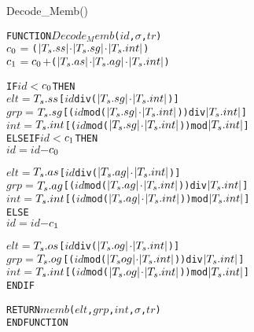 \documentclass[11pt]{report}
\newenvironment{vverbatim}
{
  \begin{alltt}
}
{
    \vspace{-\baselineskip}
  \end{alltt}
}
\newlength{\valgorithmboxwidth}
\newenvironment{valgorithm}[3][tbhp]
{
  \setlength{\valgorithmboxwidth}{\linewidth-2em}

  \begin{valgorithmfloat}[#1]
    \caption{#2}
    \label{#3}
    \hspace{1em}
    \begin{lrbox}{\valgorithmbox}
      \begin{minipage}[l]{\valgorithmboxwidth}
        \small
        \begin{vverbatim}
}
{
        \end{vverbatim}
      \end{minipage}
    \end{lrbox}
    \framebox[\valgorithmboxwidth][l]{\usebox{\valgorithmbox}}
  \end{valgorithmfloat}
}
\begin{document}
        \begin{valgorithm}[tbhp]{Decode\_Memb()}{algo-decode-memb}
FUNCTION \(Decode_Memb\)(\(id\), \(\sigma\), \(tr\))
  \(c\sb{0}\) \(=\) (\(|T\sb{s}.ss|\) \(\cdot\) \(|T\sb{s}.sg|\) \(\cdot\) \(|T\sb{s}.int|\)) 
  \(c\sb{1}\) \(=\) \(c\sb{0}\) \(+\) (\(|T\sb{s}.as|\) \(\cdot\) \(|T\sb{s}.ag|\) \(\cdot\) \(|T\sb{s}.int|\)) 

  IF \(id\) \(<\) \(c\sb{0}\) THEN
    \(elt\) \(=\) \(T\sb{s}.ss\)[\(id\) div (\(|T\sb{s}.sg|\) \(\cdot\) \(|T\sb{s}.int|\))]
    \(grp\) \(=\) \(T\sb{s}.sg\)[(\(id\) mod (\(|T\sb{s}.sg|\) \(\cdot\) \(|T\sb{s}.int|\))) div \(|T\sb{s}.int|\)]
    \(int\) \(=\) \(T\sb{s}.int\)[(\(id\) mod (\(|T\sb{s}.sg|\) \(\cdot\) \(|T\sb{s}.int|\))) mod \(|T\sb{s}.int|\)]
  ELSE IF \(id\) \(<\) \(c\sb{1}\) THEN
    \(id\) \(=\) \(id\) \(-\) \(c\sb{0}\)

    \(elt\) \(=\) \(T\sb{s}.as\)[\(id\) div (\(|T\sb{s}.ag|\) \(\cdot\) \(|T\sb{s}.int|\))]
    \(grp\) \(=\) \(T\sb{s}.ag\)[(\(id\) mod (\(|T\sb{s}.ag|\) \(\cdot\) \(|T\sb{s}.int|\))) div \(|T\sb{s}.int|\)]
    \(int\) \(=\) \(T\sb{s}.int\)[(\(id\) mod (\(|T\sb{s}.ag|\) \(\cdot\) \(|T\sb{s}.int|\))) mod \(|T\sb{s}.int|\)]
  ELSE
    \(id\) \(=\) \(id\) \(-\) \(c\sb{1}\)

    \(elt\) \(=\) \(T\sb{s}.os\)[\(id\) div (\(|T\sb{s}.og|\) \(\cdot\) \(|T\sb{s}.int|\))]
    \(grp\) \(=\) \(T\sb{s}.og\)[(\(id\) mod (\(|T\sb{s}og|\) \(\cdot\) \(|T\sb{s}.int|\))) div \(|T\sb{s}.int|\)]
    \(int\) \(=\) \(T\sb{s}.int\)[(\(id\) mod (\(|T\sb{s}.og|\) \(\cdot\) \(|T\sb{s}.int|\))) mod \(|T\sb{s}.int|\)]
  ENDIF

  RETURN \(memb\)(\(elt\), \(grp\), \(int\), \(\sigma\), \(tr\))
ENDFUNCTION
        \end{valgorithm}
\end{document}
